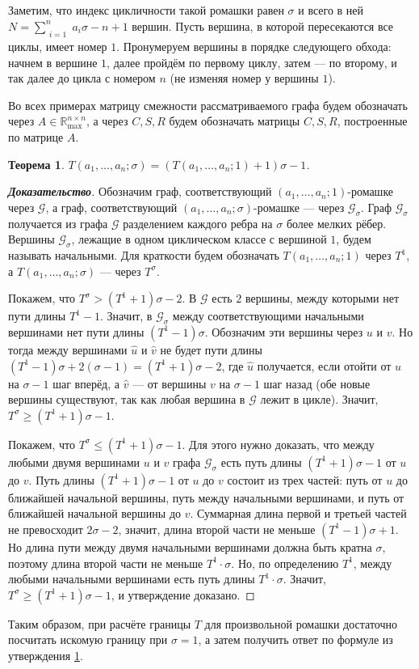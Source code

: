 \documentclass[12pt]{article}
\newtheorem{theorem}{Теорема}[section]
\begin{document}
Заметим, что индекс цикличности такой ромашки равен $\sigma$ и всего в ней $N = \sum\limits_{\substack{i=1}}^n a_i\sigma - n + 1$ вершин. Пусть вершина, в которой пересекаются все циклы, имеет номер $1$. Пронумеруем вершины в порядке следующего обхода: начнем в вершине $1$, далее пройдём по первому циклу, затем --- по второму, и так далее до цикла с номером $n$ (не изменяя номер у вершины $1$).

Во всех примерах матрицу смежности рассматриваемого графа будем обозначать через $A \in \mathbb{R}_{\max}^{n \times n}$, а через $C, S, R$ будем обозначать матрицы $C, S, R$, построенные по матрице $A$.

\begin{theorem}
\label{everyKFormula}
$T(a_1, \dots, a_n; \sigma) = (T(a_1, \dots, a_n; 1) + 1)\sigma - 1$.
\end{theorem}
\begin{proof}[\textbf{Доказательство}] 
Обозначим граф, соответствующий $(a_1, \dots, a_n; 1)$-ромашке через $\mathcal{G}$, а граф, соответствующий $(a_1, \dots, a_n; \sigma)$-ромашке --- через $\mathcal{G}_\sigma$. Граф $\mathcal{G}_\sigma$ получается из графа $\mathcal{G}$ разделением каждого ребра на $\sigma$ более мелких рёбер. Вершины $\mathcal{G}_\sigma$, лежащие в одном циклическом классе с вершиной $1$, будем называть начальными. Для краткости будем обозначать $T(a_1, \dots, a_n; 1)$ через $T^1$, а $T(a_1, \dots, a_n; \sigma)$ --- через $T^{\sigma}$.

Покажем, что $T^{\sigma} > (T^1 + 1)\sigma - 2$. В $\mathcal{G}$ есть $2$ вершины, между которыми нет пути длины $T^1 - 1$. Значит, в $\mathcal{G}_\sigma$ между соответствующими начальными вершинами нет пути длины $(T^1 - 1)\sigma$. Обозначим эти вершины через $u$ и $v$. Но тогда между вершинами $\hat{u}$ и $\hat{v}$ не будет пути длины $(T^1 - 1)\sigma + 2(\sigma - 1) = (T^1 + 1)\sigma - 2$, где $\hat{u}$ получается, если отойти от $u$ на $\sigma - 1$  шаг вперёд, а $\hat{v}$ --- от вершины $v$ на $\sigma - 1$ шаг назад (обе новые вершины существуют, так как любая вершина в $\mathcal{G}$ лежит в цикле). Значит, $T^{\sigma} \ge (T^1 + 1)\sigma - 1$.

Покажем, что $T^{\sigma} \le (T^1 + 1)\sigma - 1$. Для этого нужно доказать, что между любыми двумя вершинами $u$ и $v$ графа $\mathcal{G}_\sigma$ есть путь длины $(T^1 + 1)\sigma - 1$ от $u$ до $v$. Путь длины $(T^1 + 1)\sigma - 1$ от $u$ до $v$ состоит из трех частей: путь от $u$ до ближайшей начальной вершины, путь между начальными вершинами, и путь от ближайшей начальной вершины до $v$. Суммарная длина первой и третьей частей не превосходит $2\sigma - 2$, значит, длина второй части не меньше $(T^1 - 1)\sigma + 1$. Но длина пути между двумя начальными вершинами должна быть кратна $\sigma$, поэтому длина второй части не меньше $T^1\cdot \sigma$. Но, по определению $T^1$, между любыми начальными вершинами есть путь длины $T^1\cdot \sigma$. Значит, $T^{\sigma} \ge (T^1 + 1)\sigma - 1$, и утверждение доказано.
\end{proof}
Таким образом, при расчёте границы $T$ для произвольной ромашки достаточно посчитать искомую границу при $\sigma = 1$, а затем получить ответ по формуле из утверждения \ref{everyKFormula}. 
\end{document}
